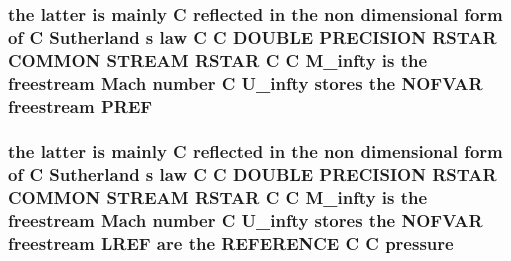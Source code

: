 \hypertarget{msa20_2home_2abonfi_2_c_f_d__codes_2_eul_f_s_83_82_83_2include_2stream_8com_ac527abdf107d6bddcbc6a80631e1ab59}{
\subsubsection[{P\-R\-E\-F}]{\setlength{\rightskip}{0pt plus 5cm}the latter is mainly C reflected in the non dimensional form of C Sutherland s law C C D\-O\-U\-B\-L\-E P\-R\-E\-C\-I\-S\-I\-O\-N R\-S\-T\-A\-R C\-O\-M\-M\-O\-N S\-T\-R\-E\-A\-M R\-S\-T\-A\-R C C {\bf M\-\_\-infty} is the freestream Mach number C {\bf U\-\_\-infty} stores the N\-O\-F\-V\-A\-R freestream P\-R\-E\-F}}\label{msa20_2home_2abonfi_2_c_f_d__codes_2_eul_f_s_83_82_83_2include_2stream_8com_ac527abdf107d6bddcbc6a80631e1ab59}
\hypertarget{msa20_2home_2abonfi_2_c_f_d__codes_2_eul_f_s_83_82_83_2include_2stream_8com_a0facbcffae9f2ce2b94119850b5fc3d3}{
\subsubsection[{pressure}]{\setlength{\rightskip}{0pt plus 5cm}the latter is mainly C reflected in the non dimensional form of C Sutherland s law C C D\-O\-U\-B\-L\-E P\-R\-E\-C\-I\-S\-I\-O\-N R\-S\-T\-A\-R C\-O\-M\-M\-O\-N S\-T\-R\-E\-A\-M R\-S\-T\-A\-R C C {\bf M\-\_\-infty} is the freestream Mach number C {\bf U\-\_\-infty} stores the N\-O\-F\-V\-A\-R freestream {\bf L\-R\-E\-F} {\bf are} the R\-E\-F\-E\-R\-E\-N\-C\-E C C pressure}}\label{msa20_2home_2abonfi_2_c_f_d__codes_2_eul_f_s_83_82_83_2include_2stream_8com_a0facbcffae9f2ce2b94119850b5fc3d3}
